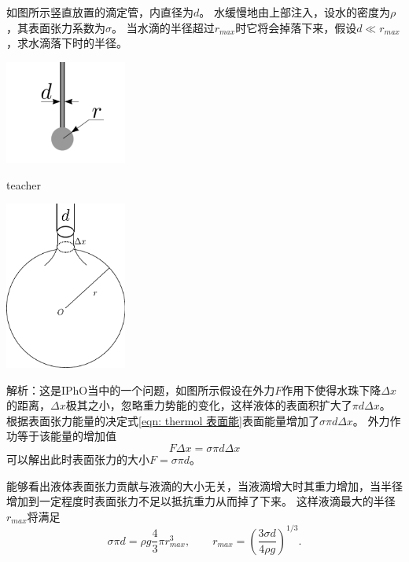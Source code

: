 \begin{example}
如图所示竖直放置的滴定管，内直径为$d$。
水缓慢地由上部注入，设水的密度为$\rho$，其表面张力系数为$\sigma$。
当水滴的半径超过$r_{max}$时它将会掉落下来，假设$d\ll r_{max}$，求水滴落下时的半径。
\begin{flushright}
\includegraphics[width=0.3\textwidth]{images/water-drop.pdf}
\end{flushright}
\begin{taggedblock}{teacher}
\begin{center}
\includegraphics[width=0.3\textwidth]{images/water-drop-1.pdf}
\end{center}
\noindent
解析：这是IPhO当中的一个问题，如图所示假设在外力$F$作用下使得水珠下降$\Delta x$的距离，$\Delta x$极其之小，忽略重力势能的变化，这样液体的表面积扩大了$\pi d\Delta x$。
根据表面张力能量的决定式\ref{eqn: thermol 表面能}表面能量增加了$\sigma \pi d\Delta x$。
外力作功等于该能量的增加值
\[
F\Delta x = \sigma \pi d\Delta x
\]
可以解出此时表面张力的大小$F=\sigma \pi d$。

能够看出液体表面张力贡献与液滴的大小无关，当液滴增大时其重力增加，当半径增加到一定程度时表面张力不足以抵抗重力从而掉了下来。
这样液滴最大的半径$r_{max}$将满足
\[
\sigma \pi d = \rho g\frac{4}{3} \pi r_{max}^3,\qquad r_{max} = \left(\frac{3\sigma d}{4\rho g}\right)^{1/3} .
\]
\end{taggedblock}
\end{example}

